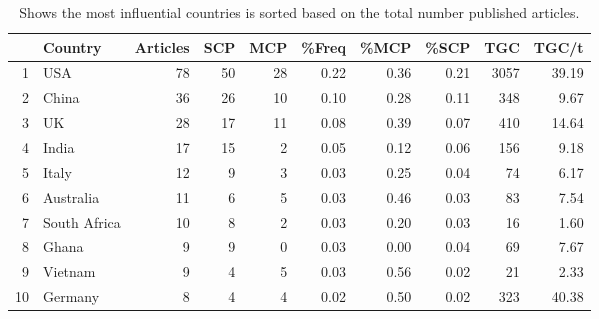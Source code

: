 \begin{table}[ht]
\centering
\footnotesize
\begin{tabular}{rlrrrrrrrr}
		\toprule
 & Country & Articles & SCP & MCP & \%Freq & \%MCP & \%SCP & TGC & TGC/t \\ 
 \midrule
1 & USA             &  78 &  50 &  28 & 0.22 & 0.36 & 0.21 & 3057 & 39.19 \\ 
  2 & China           &  36 &  26 &  10 & 0.10 & 0.28 & 0.11 & 348 & 9.67 \\ 
  3 & UK  &  28 &  17 &  11 & 0.08 & 0.39 & 0.07 & 410 & 14.64 \\ 
  4 & India           &  17 &  15 &   2 & 0.05 & 0.12 & 0.06 & 156 & 9.18 \\ 
  5 & Italy           &  12 &   9 &   3 & 0.03 & 0.25 & 0.04 &  74 & 6.17 \\ 
  6 & Australia       &  11 &   6 &   5 & 0.03 & 0.46 & 0.03 &  83 & 7.54 \\ 
  7 & South Africa    &  10 &   8 &   2 & 0.03 & 0.20 & 0.03 &  16 & 1.60 \\ 
  8 & Ghana           &   9 &   9 &   0 & 0.03 & 0.00 & 0.04 &  69 & 7.67 \\ 
  9 & Vietnam         &   9 &   4 &   5 & 0.03 & 0.56 & 0.02 &  21 & 2.33 \\ 
  10 & Germany         &   8 &   4 &   4 & 0.02 & 0.50 & 0.02 & 323 & 40.38 \\ 
  	\bottomrule
\end{tabular}
\caption{Shows the most influential countries is sorted based on the total number published articles.} 
\label{tab:Most-Cited-Countries}
\end{table}
